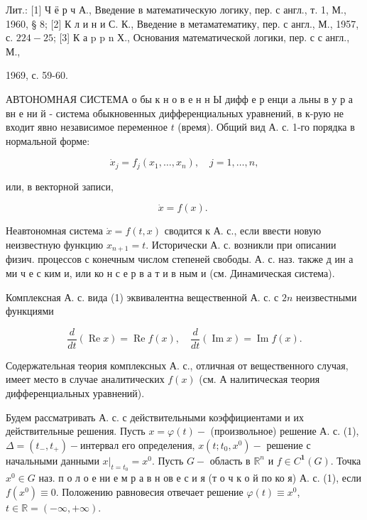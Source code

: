 \documentclass[10pt]{article}
\begin{document}
Лит.: [1] Ч ё р ч А., Введение в математическую логику, пер. с англ., т. 1, М., 1960, § 8; [2] К л и н и С. К., Введение в метаматематику, пер. с англ., М., 1957, с. $224-25$; [3] К а p p n Х., Основания математической логики, пер. с с англ., М.,

1969, с. 59-60.



АВТОНОМНАЯ СИСТЕМА о бы к н о в е н н Ы дифф е р енци а льны в у р а вн е ни й - система обыкновенных дифференциальных уравнений, в к-рую не входит явно независимое переменное $t$ (время). Общий вид А. с. 1-го порядка в нормальной форме:



\[

\dot{x}_{j}=f_{j}\left(x_{1}, \ldots, x_{n}\right), \quad j=1, \ldots, n,

\]



или, в векторной записи,



\[

\dot{x}=f(x) \text {. }

\]



Неавтономная система $\dot{x}=f(t, x)$ сводится к А. с., если ввести новую неизвестную функцию $x_{n+1}=t$. Исторически А. с. возникли при описании физич. процессов с конечным числом степеней свободы. А. с. наз. также д ин а ми ч е с ким и, или ко н с е р в а т и в ным и (см. Динамическая система).



Комплексная А. с. вида (1) эквивалентна вещественной А. с. с $2 n$ неизвестными функциями



\[

\frac{d}{d t}(\operatorname{Re} x)=\operatorname{Re} f(x), \quad \frac{d}{d t}(\operatorname{Im} x)=\operatorname{Im} f(x) .

\]



Содержательная теория комплексных А. с., отличная от вещественного случая, имеет место в случае аналитических $f(x)$ (см. А налитическая теория дифференциальных уравнений).



Будем рассматривать А. с. с действительными коэффициентами и их действительные решения. Пусть $x=\varphi(t)-$ (произвольное) решение А. с. (1), $\Delta=\left(t_{-}, t_{+}\right)-$интервал его определения, $x\left(t ; t_{0}, x^{0}\right)-$ решение с начальными данными $\left.x\right|_{t=t_{0}}=x^{0}$. Пусть $G-$ область в $\mathbb{R}^{n}$ и $f \in C^{\mathbf{1}}(G)$. Точка $x^{0} \in G$ наз. п о л о е ни е м р а в н ов е с и я (т о ч к о й по ко я) А. с. (1), если $f\left(x^{0}\right) \equiv 0$. Положению равновесия отвечает решение $\varphi(t) \equiv x^{0}$, $t \in \mathbb{R}=(-\infty,+\infty)$.
\end{document}
